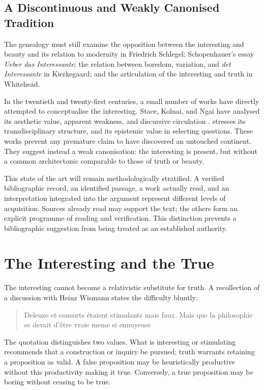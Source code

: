 \documentclass[11pt,a4paper]{article}
\begin{document}
\subsection{A Discontinuous and Weakly Canonised Tradition}

The genealogy must still examine the opposition between the interesting and
beauty and its relation to modernity in Friedrich Schlegel; Schopenhauer's essay
\emph{Ueber das Interessante}; the relation between boredom, variation, and
\emph{det Interessante} in Kierkegaard; and the articulation of the interesting
and truth in Whitehead.

In the twentieth and twenty-first centuries, a small number of works have
directly attempted to conceptualise the interesting. Stace, Kolnai, and Ngai
have analysed its aesthetic value, apparent weakness, and discursive circulation
\parencite{stace1944interestingness,kolnai1964concept,ngai2008merely,ngai2012categories}.
\textcite{epstein2009interesting} stresses its transdisciplinary structure, and
\textcite{grimm2011interesting} its epistemic value in selecting questions.
These works prevent any premature claim to have discovered an untouched
continent. They suggest instead a weak canonisation: the interesting is present,
but without a common architectonic comparable to those of truth or beauty.

This state of the art will remain methodologically stratified. A verified
bibliographic record, an identified passage, a work actually read, and an
interpretation integrated into the argument represent different levels of
acquisition. Sources already read may support the text; the others form an
explicit programme of reading and verification. This distinction prevents a
bibliographic suggestion from being treated as an established authority.

\section{The Interesting and the True}

The interesting cannot become a relativistic substitute for truth. A
recollection of a discussion with Heinz Wismann states the difficulty bluntly:

\begin{quote}
Deleuze et consorts étaient stimulants mais faux. Mais que la philosophie se
devait d'être vraie meme si ennuyeuse
\end{quote}

The quotation distinguishes two values. What is interesting or stimulating
recommends that a construction or inquiry be pursued; truth warrants retaining
a proposition as valid. A false proposition may be heuristically productive
without this productivity making it true. Conversely, a true proposition may
be boring without ceasing to be true.
\end{document}
